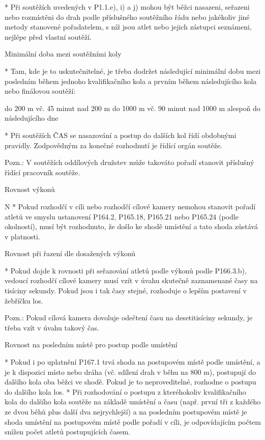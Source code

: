 * Při soutěžích uvedených v P1.1.e), i) a j) mohou být běžci nasazeni, seřazeni nebo rozmístěni do drah podle příslušného soutěžního řádu nebo jakékoliv jiné metody stanovené pořadatelem, s níž jsou atlet nebo jejich zástupci seznámeni, nejlépe před vlastní soutěží.

Minimální doba mezi soutěžními koly

* Tam, kde je to uskutečnitelné, je třeba dodržet následující minimální dobu mezi posledním během jednoho kvalifikačního kola a prvním během následujícího kola nebo finálovou soutěží:

do   200 m vč.                            45 minut
nad 200 m  do 1000 m vč.          90 minut
nad 1000 m                                alespoň do následujícího dne

* Při soutěžích ČAS se nasazování a postup do dalších kol řídí obdobnými pravidly. Zodpovědným za konečné rozhodnutí je řídící orgán soutěže.

Pozn.: V soutěžích oddílových družstev může takováto pořadí stanovit příslušný řídící pracovník soutěže.
\enditems

\secc Rovnost výkonů

\begitems \style N
* Pokud rozhodčí v cíli nebo rozhodčí cílové kamery nemohou stanovit pořadí atletů ve smyslu ustanovení P164.2, P165.18, P165.21 nebo P165.24 (podle okolností), musí být rozhodnuto, že došlo ke shodě umístění a tato shoda zůstává v platnosti.

Rovnost při řazení dle dosažených výkonů

* Pokud dojde k rovnosti při seřazování atletů podle výkonů podle P166.3.b), vedoucí rozhodčí cílové kamery musí vzít v úvahu skutečně zaznamenané časy na tisíciny sekundy. Pokud jsou i tak časy stejné, rozhoduje o lepším postavení v žebříčku los.

Pozn.: Pokud cílová kamera dovoluje odečtení času na desetitisíciny sekundy, je třeba vzít v úvahu takový čas.

Rovnost na posledním místě pro postup podle umístění

* Pokud i po uplatnění P167.1 trvá shoda na postupovém místě podle umístění, a je k dispozici místo nebo dráha (vč. sdílení drah v běhu na 800 m), postupují do dalšího kola oba běžci ve shodě. Pokud je to neproveditelné, rozhodne o postupu do dalšího kola los.
* Při rozhodování o postupu z kteréhokoliv kvalifikačního kola do dalšího kola soutěže na základě umístění a času (např. první tři z každého ze dvou běhů plus další dva nejrychlejší) a na posledním postupovém místě je shoda umístění na postupovém místě podle pořadí v cíli, je odpovídajícím počtem snížen počet atletů postupujících časem.

